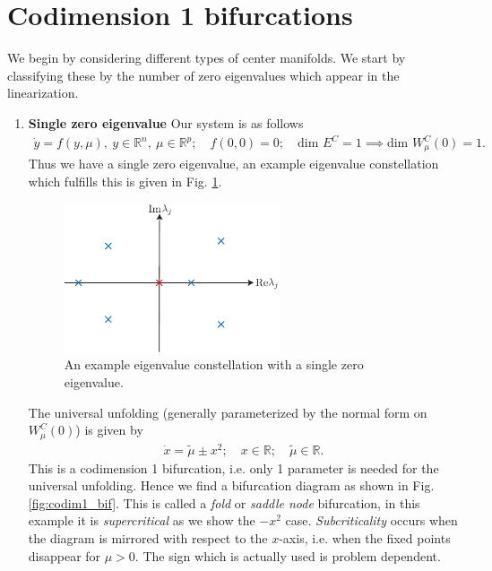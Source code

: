 \section{Codimension 1 bifurcations}
We begin by considering different types of center manifolds. We start by classifying these by the number of zero eigenvalues which appear in the linearization.
\begin{enumerate}
	\item \textbf{Single zero eigenvalue} Our system is as follows
		\begin{align}
			\dot{y} = f(y, \mu),\ y \in \mathbb{R}^{n},\ \mu\in \mathbb{R}^{p};\quad f(0,0)=0;\quad  \textrm{dim }E^{C}=1\implies  \textrm{dim } W^{C}_{\mu }(0)=1.  
		\end{align}
		Thus we have a single zero eigenvalue, an example eigenvalue constellation which fulfills this is given in Fig. \ref{fig:1zero_eigv}.
		\begin{figure}[h!]
			\centering
			\includegraphics[width=0.6\textwidth]{figures/ch3/12onezero_eigv.pdf}
			\caption{An example eigenvalue constellation with a single zero eigenvalue.}
			\label{fig:1zero_eigv}
		\end{figure}
		The universal unfolding (generally parameterized by the normal form on $W^{C}_{\mu }(0)$) is given by
		\begin{align}
			\boxed{
				\dot{x} = \tilde{\mu }\pm x^2;\quad x \in \mathbb{R};\quad \tilde{\mu } \in\mathbb{R}.
			}
		\end{align}
		This is a codimension 1 bifurcation, i.e. only 1 parameter is needed for the universal unfolding. Hence we find a bifurcation diagram as shown in Fig. \ref{fig:codim1_bif}. This is called a \emph{fold} or \emph{saddle node} bifurcation, in this example it is \emph{supercritical} as we show the $-x^2$ case. \emph{Subcriticality} occurs when the diagram is mirrored with respect to the $x$-axis, i.e. when the fixed points disappear for $\mu > 0$. The sign which is actually used is problem dependent.

\end{enumerate}
